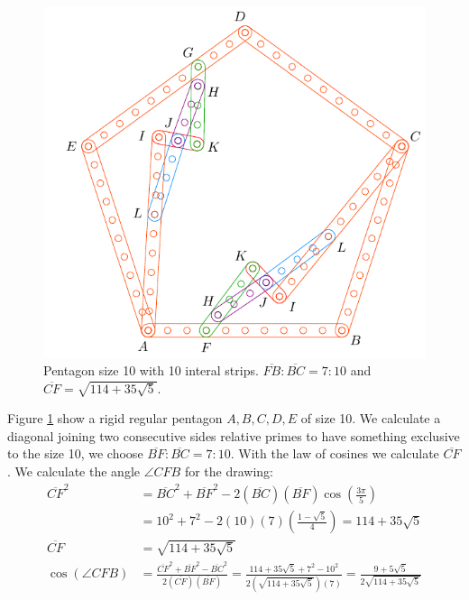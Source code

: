 \documentclass[11pt]{article}
\begin{document}
\begin{figure}[H]
 \centering
 \includegraphics[scale=0.9]{10/penta10a}
 \caption{Pentagon size 10 with 10 interal strips. $\overline{FB}:\overline{BC} = 7:10$ and $\overline{CF} = \sqrt{114 + 35\sqrt5}$.}
 \label{fig:penta10a}
\end{figure}

Figure \ref{fig:penta10a} show a rigid regular pentagon $A,B,C,D,E$ of size 10. We calculate a diagonal joining two consecutive sides relative primes to have something exclusive to the size 10, we choose $\overline{BF}:\overline{BC} = 7:10$. With the law of cosines we calculate $\overline{CF}$.
We calculate the angle $\angle{CFB}$ for the drawing:
\begin{align}
\overline{CF}^2 &= \overline{BC}^2 + \overline{BF}^2
 - 2(\overline{BC})(\overline{BF})\cos\left(\frac{3\pi}5\right) \nonumber\\
 &= 10^2 + 7^2 - 2(10)(7)\left(\frac{1-\sqrt5}4\right) = 114 + 35\sqrt5 \nonumber\\
\overline{CF} &= \sqrt{114 + 35\sqrt5} \\
\cos(\angle{CFB}) &= \frac{\overline{CF}^2 + \overline{BF}^2 - \overline{BC}^2}
 {2(\overline{CF})(\overline{BF})}%
 = \frac{114+35\sqrt5 + 7^2 - 10^2}{2(\sqrt{114 + 35\sqrt5})(7)}
  = \frac{9+5\sqrt5}{2\sqrt{114+35\sqrt5}}
\end{align}
\end{document}
